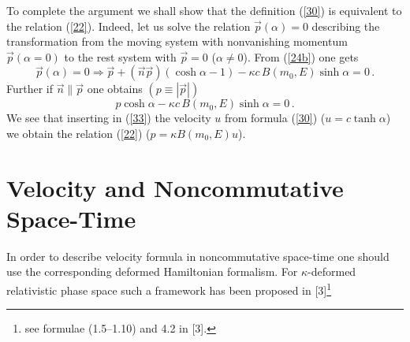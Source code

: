 \documentclass[a4paper,12pt]{article}
\begin{document}
To complete the argument we shall show that the definition
(\ref{30}) is equivalent to the relation (\ref{22}). Indeed, let
us solve the relation $\vec{p}(\alpha)=0 $ describing the
transformation from the moving system with nonvanishing momentum
$\vec{p}(\alpha=0) $ to the rest system with $\vec{p}=0 $ ($\alpha
\neq 0$). From (\ref{24b}) one gets
\begin{equation}\label{32}
\vec{p}(\alpha)=0 \Longrightarrow \vec{p} + ( \vec{n}\vec{p})(\cosh \alpha -1 )
- \kappa c \, B(m_0 , E) \sinh \alpha = 0 \, .
\end{equation}
Further if $ \vec{n}\| \vec{p}$ one obtains $(p  \equiv | \vec{p}|)$
\begin{equation}\label{33}
  p \cosh \alpha - \kappa c \, B(m_0 , E) \sinh \alpha = 0 \, .
\end{equation}
We see that inserting in (\ref{33}) the velocity $u$ from formula
(\ref{30}) ($u = c\tanh \alpha $) we obtain the relation
(\ref{22}) ($p = \kappa B(m_0 , E)u$).

\section{Velocity and Noncommutative Space-Time}

In order to describe velocity formula  in noncommutative
space-time one should use the corresponding deformed Hamiltonian
formalism. For $\kappa$-de\-formed relativistic phase space such a
framework has been proposed in [3]\footnote{see formulae
  (1.5--1.10) and  4.2 in [3].}
\end{document}

